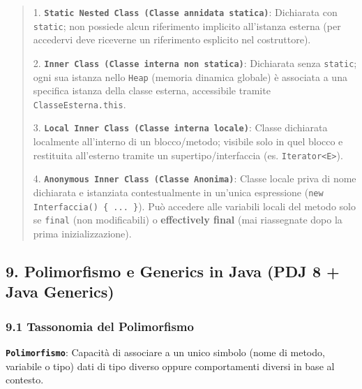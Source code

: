 \begin{quote}\small



1. \textbf{\texttt{Static Nested Class (Classe annidata statica)}}: Dichiarata con \texttt{static}; non possiede alcun riferimento implicito all'istanza esterna (per accedervi deve riceverne un riferimento esplicito nel costruttore).

2. \textbf{\texttt{Inner Class (Classe interna non statica)}}: Dichiarata senza \texttt{static}; ogni sua istanza nello \texttt{Heap} (memoria dinamica globale) è associata a una specifica istanza della classe esterna, accessibile tramite \texttt{ClasseEsterna.this}.

3. \textbf{\texttt{Local Inner Class (Classe interna locale)}}: Classe dichiarata localmente all'interno di un blocco/metodo; visibile solo in quel blocco e restituita all'esterno tramite un supertipo/interfaccia (es. \texttt{Iterator<E>}).

4. \textbf{\texttt{Anonymous Inner Class (Classe Anonima)}}: Classe locale priva di nome dichiarata e istanziata contestualmente in un'unica espressione (\texttt{new Interfaccia() \{ ... \}}). Può accedere alle variabili locali del metodo solo se \texttt{final} (non modificabili) o \textbf{effectively final} (mai riassegnate dopo la prima inizializzazione).

\end{quote}

\subsection{9. Polimorfismo e Generics in Java (PDJ 8 + Java Generics)}\label{9-polimorfismo-e-generics-in-java-pdj-8-java-generics}

\subsubsection{9.1 Tassonomia del Polimorfismo}\label{9-1-tassonomia-del-polimorfismo}

\textbf{\texttt{Polimorfismo}}: Capacità di associare a un unico simbolo (nome di metodo, variabile o tipo) dati di tipo diverso oppure comportamenti diversi in base al contesto.

